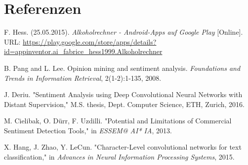 \chapter{Referenzen}
\begin{thebibliography}{9}
  
  F. Hess. (25.05.2015). \emph{Alkoholrechner - Android-Apps auf Google Play} [Online]. URL: \url{https://play.google.com/store/apps/details?id=appinventor.ai_fabrice_hess1999.Alkoholrechner}

  B. Pang and L. Lee. Opinion mining and sentiment analysis. \emph{Foundations and Trends in Information Retrieval}, 2(1-2):1-135, 2008.
  
  J. Deriu. "Sentiment Analysis using Deep Convolutional Neural Networks with Distant Supervision," M.S. thesis, Dept. Computer Science, ETH, Zurich, 2016.
  
  M. Cielibak, O. Dürr, F. Uzdilli. "Potential and Limitations of Commercial Sentiment Detection Tools," in \emph{ESSEM@ AI* IA}, 2013.
  
  X. Hang, J. Zhao, Y. LeCun. "Character-Level convolutional networks for text classification," in \emph{Advances in Neural Information Processing Systems}, 2015.

\end{thebibliography}